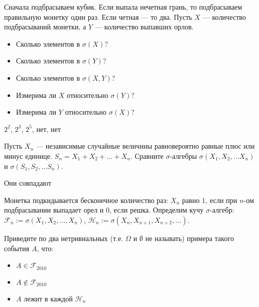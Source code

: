 \begin{solution}
\begin{problem}
Сначала подбрасываем кубик. Если выпала нечетная грань, то подбрасываем правильную монетку один раз. Если четная --- то два. Пусть $X$ --- количество подбрасываний монетки, а $Y$ --- количество выпавших орлов.

\begin{itemize}

\item Сколько элементов в $ \sigma(X)$? 
\item Сколько элементов в $ \sigma(Y)$? 
\item Сколько элементов в $ \sigma(X,Y)$? 
\item Измерима ли $ X $ относительно $ \sigma(Y)$? 
\item Измерима ли $ Y $ относительно $ \sigma(X)$? 

\end{itemize} 
\end{problem} 
\begin{solution} 
 $ 2^{2} $, $ 2^{3} $, $ 2^{5} $, нет, нет
\end{solution}

\begin{problem}
Пусть $X_{n}$ --- независимые случайные величины равновероятно равные плюс или минус единице. $S_{n}=X_{1}+X_{2}+\ldots+X_{n}$. Сравните $\sigma$-алгебры $ \sigma(X_{1},X_{2},\ldots X_{n}) $ и $ \sigma(S_{1},S_{2},\ldots S_{n}) $.
\end{problem} 
\begin{solution} 
Они совпадают
\end{solution}

\begin{problem}
Монетка подкидывается бесконечное количество раз: $X_{n}$ равно 1, если при $ n $-ом подбрасывании выпадает орел и 0, если решка. Определим кучу $ \sigma $-алгебр: $\mathcal{F}_{n}:=\sigma(X_{1},X_{2},\ldots,X_{n})$, $\mathcal{H}_{n}:=\sigma(X_{n},X_{n+1},X_{n+2},\ldots)$.

Приведите по два нетривиальных (т.е. $ \Omega $ и $ \emptyset $ не называть) примера такого события $ A $, что:

\begin{itemize}
\item $ A\in \mathcal{F}_{2010} $
\item $ A\notin \mathcal{F}_{2010} $
\item $A$ лежит в каждой $\mathcal{H}_{n}$
\end{itemize}


\end{problem}
\end{solution}
